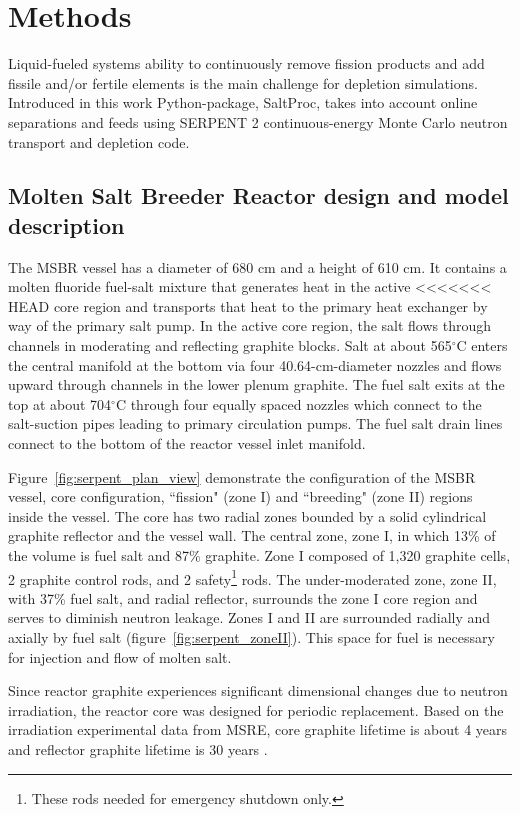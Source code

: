 \section{Methods}

Liquid-fueled systems ability to continuously remove fission products and add 
fissile and/or fertile elements is the main challenge for depletion simulations. 
Introduced in this work Python-package, SaltProc, takes into account online 
separations and feeds using SERPENT 2 continuous-energy Monte Carlo neutron 
transport and depletion code.

\subsection{Molten Salt Breeder Reactor design and model description}
The \gls{MSBR} vessel has a diameter of 680 cm and a height of 610 cm. It 
contains a molten fluoride fuel-salt mixture that generates heat in the active 
<<<<<<< HEAD
core region and transports that heat to the primary heat exchanger by way of the 
primary salt pump. In the active core region, the salt flows through channels in 
moderating and reflecting graphite blocks. Salt at about 565$^{\circ}$C enters 
the central manifold at the bottom via four 40.64-cm-diameter nozzles and flows 
upward through channels in the lower plenum graphite. The fuel salt exits at the 
top at about 704$^{\circ}$C through four equally spaced nozzles which connect to 
the salt-suction pipes leading to primary circulation pumps. The fuel salt drain 
lines connect to the bottom of the reactor vessel inlet manifold.

Figure~\ref{fig:serpent_plan_view} demonstrate the configuration of the 
\gls{MSBR} vessel, core configuration, ``fission" (zone I) and ``breeding" (zone 
II) regions inside the vessel. The core has two radial zones bounded by a solid 
cylindrical graphite reflector and the vessel wall. The central zone, zone I, in 
which 13\% of the volume is fuel salt and 87\% graphite. Zone I composed of 
1,320 graphite cells, 2 graphite control rods, and 2 safety\footnote{ These rods 
needed for emergency shutdown only.} rods. The under-moderated zone, zone II, 
with 37\% fuel salt, and radial reflector, surrounds the zone I core region and 
serves to diminish neutron leakage. Zones I and II are surrounded radially and 
axially by fuel salt (figure~\ref{fig:serpent_zoneII}). This space for fuel is 
necessary for injection and flow of molten salt.

Since reactor graphite experiences significant dimensional changes due to 
neutron irradiation, the reactor core was designed for periodic replacement. 
Based on the irradiation experimental data from \gls{MSRE}, core graphite 
lifetime is about 4 years and reflector graphite lifetime is 30 years 
\cite{robertson_conceptual_1971}.


